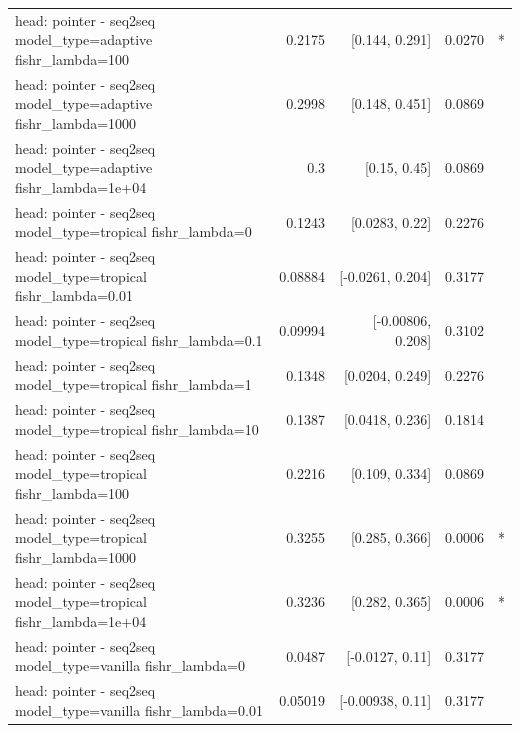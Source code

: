 \documentclass[10pt]{article}
\makeatletter
\newcommand{\stackcell}[1]{\begin{tabular}[t]{@{}l@{}}#1\end{tabular}}
\makeatother
\begin{document}
{\begin{longtable}{lrrrl}
\stackcell{head: pointer - seq2seq\\\footnotesize model\_type=adaptive fishr\_lambda=100 } & 0.2175 & [0.144, 0.291] & 0.0270 & *\\
\stackcell{head: pointer - seq2seq\\\footnotesize model\_type=adaptive fishr\_lambda=1000 } & 0.2998 & [0.148, 0.451] & 0.0869 & \\
\stackcell{head: pointer - seq2seq\\\footnotesize model\_type=adaptive fishr\_lambda=1e+04 } & 0.3 & [0.15, 0.45] & 0.0869 & \\
\stackcell{head: pointer - seq2seq\\\footnotesize model\_type=tropical fishr\_lambda=0 } & 0.1243 & [0.0283, 0.22] & 0.2276 & \\
\stackcell{head: pointer - seq2seq\\\footnotesize model\_type=tropical fishr\_lambda=0.01 } & 0.08884 & [-0.0261, 0.204] & 0.3177 & \\
\stackcell{head: pointer - seq2seq\\\footnotesize model\_type=tropical fishr\_lambda=0.1 } & 0.09994 & [-0.00806, 0.208] & 0.3102 & \\
\stackcell{head: pointer - seq2seq\\\footnotesize model\_type=tropical fishr\_lambda=1 } & 0.1348 & [0.0204, 0.249] & 0.2276 & \\
\stackcell{head: pointer - seq2seq\\\footnotesize model\_type=tropical fishr\_lambda=10 } & 0.1387 & [0.0418, 0.236] & 0.1814 & \\
\stackcell{head: pointer - seq2seq\\\footnotesize model\_type=tropical fishr\_lambda=100 } & 0.2216 & [0.109, 0.334] & 0.0869 & \\
\stackcell{head: pointer - seq2seq\\\footnotesize model\_type=tropical fishr\_lambda=1000 } & 0.3255 & [0.285, 0.366] & 0.0006 & *\\
\stackcell{head: pointer - seq2seq\\\footnotesize model\_type=tropical fishr\_lambda=1e+04 } & 0.3236 & [0.282, 0.365] & 0.0006 & *\\
\stackcell{head: pointer - seq2seq\\\footnotesize model\_type=vanilla fishr\_lambda=0 } & 0.0487 & [-0.0127, 0.11] & 0.3177 & \\
\stackcell{head: pointer - seq2seq\\\footnotesize model\_type=vanilla fishr\_lambda=0.01 } & 0.05019 & [-0.00938, 0.11] & 0.3177 & \\

\end{longtable}}
\end{document}
